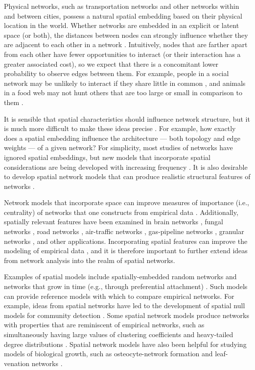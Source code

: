 \documentclass[%
 reprint,
 amsmath,amssymb,
 aps,
]{revtex4-1}
\begin{document}
Physical networks, such as transportation networks and other networks within and between cities, possess a natural spatial embedding based on their physical location in the world. Whether networks are embedded in an explicit or latent space (or both), the distances between nodes can strongly influence whether they are adjacent to each other in a network \cite{spatial1, air-traffic, routelengthstatistic,papa2018}. Intuitively, nodes that are farther apart from each other have fewer opportunities to interact (or their interaction has a greater associated cost), so we expect that there is a concomitant lower probability to observe edges between them. For example, people in a social network may be unlikely to interact if they share little in common \cite{socialdistance}, and animals in a food web may not hunt others that are too large or small in comparison to them \cite{foodwebs}. 

It is sensible that spatial characteristics should influence network structure, but it is much more difficult to make these ideas precise \cite{barthelemy}. For example, how exactly does a spatial embedding influence the architecture --- both topology and edge weights --- of a given network? For simplicity, most studies of networks have ignored spatial embeddings, but new models that incorporate spatial considerations are being developed with increasing frequency \cite{barthelemy}. It is also desirable to develop spatial network models that can produce realistic structural features of networks \cite{boguna2019}.

Network models that incorporate space can improve measures of importance (i.e., centrality) of networks that one constructs from empirical data \cite{spatial1, air-traffic}. Additionally, spatially relevant features have been examined in brain networks \cite{braingrowth1, braingrowth2}, fungal networks \cite{fungal_data}, road networks \cite{road_data, spatial1, barbosa, boeing2018multi}, air-traffic networks \cite{air-traffic}, gas-pipeline networks \cite{spatialefficiency}, granular networks \cite{berthier2019,nauer2019}, and other applications. Incorporating spatial features can improve the modeling of empirical data \cite{barthelemy}, and it is therefore important to further extend ideas from network analysis into the realm of spatial networks.

Examples of spatial models include spatially-embedded random networks \cite{penrose-rgg, geographical_threshold} and networks that grow in time (e.g., through preferential attachment) \cite{mean_field_evolving_spatial, SPA1, spatial1}. Such models can provide reference models with which to compare empirical networks. For example, ideas from spatial networks have led to the development of spatial null models for community detection \cite{community1, community2}. Some spatial network models produce networks with properties that are reminiscent of empirical networks, such as simultaneously having large values of clustering coefficients and heavy-tailed degree distributions \cite{geometric_preferential_attachment, geographical_threshold2}. Spatial network models have also been helpful for studying models of biological growth, such as osteocyte-network formation \cite{mean_field_evolving_spatial} and leaf-venation networks \cite{leaf_optimization}.
\end{document}
